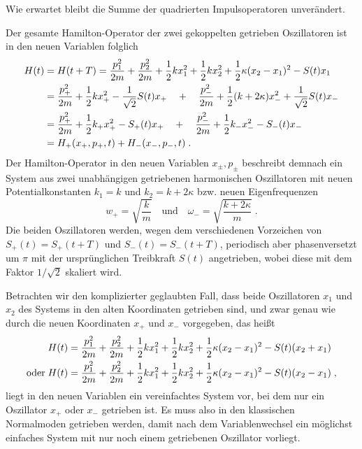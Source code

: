   Wie erwartet bleibt die Summe der quadrierten Impulsoperatoren unverändert.

  Der gesamte Hamilton-Operator der zwei gekoppelten getrieben Oszillatoren ist in den neuen Variablen folglich
  \begin{align}
    H(t) &= H(t+T) = \frac{p_1^2}{2m} + \frac{p_2^2}{2m} + \frac 1 2 kx_1^2 + \frac 1 2 kx_2^2 + \frac 1 2 \kappa(x_2-x_1)^2 - S(t)x_1 \notag\\
    &= \frac{p_+^2}{2m}+\frac{1}{2}kx_+^2-\frac{1}{\sqrt{2}}S(t)x_+ \quad + \quad
    \frac{p_-^2}{2m}+\frac{1}{2}(k+2\kappa)x_-^2+\frac{1}{\sqrt{2}}S(t)x_- \notag\\
    &= \frac{p_+^2}{2m}+\frac{1}{2}k_+x_+^2-S_+(t)x_+ \quad + \quad
    \frac{p_-^2}{2m}+\frac{1}{2}k_-x_-^2-S_-(t)x_- \notag\\
    &= H_+(x_+,p_+,t) + H_-(x_-,p_-,t) \; .
  \end{align}
  Der Hamilton-Operator in den neuen Variablen $x_{\pm},p_{\pm}$ beschreibt demnach ein System aus zwei unabhängigen getriebenen harmonischen Oszillatoren mit neuen Potentialkonstanten $k_1=k$ und $k_2=k+2\kappa$ bzw. neuen Eigenfrequenzen
  \begin{equation}
    w_+=\sqrt{\frac{k}{m}} \quad\text{und}\quad \omega_-=\sqrt{\frac{k+2\kappa}{m}} \; .
  \end{equation}
  Die beiden Oszillatoren werden, wegen dem verschiedenen Vorzeichen von $S_+(t)=S_+(t+T)$ und $S_-(t)=S_-(t+T)$, periodisch aber phasenversetzt um $\pi$ mit der ursprünglichen Treibkraft $S(t)$ angetrieben, wobei diese mit dem Faktor $1/\sqrt{2}$ skaliert wird.

  Betrachten wir den komplizierter geglaubten Fall, dass beide Oszillatoren $x_1$ und $x_2$ des Systems in den alten Koordinaten getrieben sind, und zwar genau wie durch die neuen Koordinaten $x_+$ und $x_-$ vorgegeben, das heißt
  \begin{align}
      &H(t) = \frac{p_1^2}{2m} + \frac{p_2^2}{2m} + \frac 1 2 kx_1^2 + \frac 1 2 kx_2^2 + \frac 1 2 \kappa(x_2-x_1)^2 - S(t)(x_2+x_1) \notag\\
      \text{oder} \; &H(t) = \frac{p_1^2}{2m} + \frac{p_2^2}{2m} + \frac 1 2 kx_1^2 + \frac 1 2 kx_2^2 + \frac 1 2 \kappa(x_2-x_1)^2 - S(t)(x_2-x_1) \;,
  \end{align}
  liegt in den neuen Variablen ein vereinfachtes System vor, bei dem nur ein Oszillator $x_+$ oder $x_-$ getrieben ist.
  Es muss also in den klassischen Normalmoden getrieben werden, damit nach dem Variablenwechsel ein möglichst einfaches System mit nur noch einem getriebenen Oszillator vorliegt.
